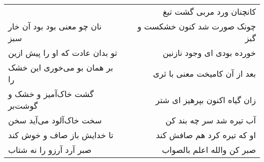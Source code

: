 \begin{center}
\begin{longtable}{l p{0.5cm} r}
&&
کانچنان ورد مربی گشت تیغ
\\
نان چو معنی بود بود آن خار سبز
&&
چونک صورت شد کنون خشکست و گبز
\\
تو بدان عادت که او را پیش ازین
&&
خورده بودی ای وجود نازنین
\\
بر همان بو می‌خوری این خشک را
&&
بعد از آن کامیخت معنی با ثری
\\
گشت خاک‌آمیز و خشک و گوشت‌بر
&&
زان گیاه اکنون بپرهیز ای شتر
\\
سخت خاک‌آلود می‌آید سخن
&&
آب تیره شد سر چه بند کن
\\
تا خدایش باز صاف و خوش کند
&&
او که تیره کرد هم صافش کند
\\
صبر آرد آرزو را نه شتاب
&&
صبر کن والله اعلم بالصواب
\\
\end{longtable}
\end{center}
